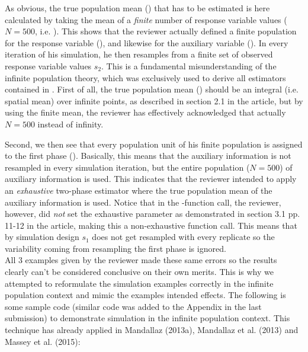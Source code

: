 \documentclass{article}
\begin{document}
As obvious, the true population mean () that has to be estimated is here calculated by taking the mean of a \textit{finite} number of response variable values ($N=500$, i.e. ). This shows that the reviewer actually defined a finite population for the response variable (), and likewise for the auxiliary variable (). In every iteration of his simulation, he then resamples from a finite set of observed response variable values $s_2$. This is a fundamental misunderstanding of the infinite population theory, which was exclusively used to derive all estimators contained in . First of all, the true population mean () should be an integral (i.e. spatial mean) over infinite points, as described in section 2.1 in the article, but by using the finite mean, the reviewer has effectively acknowledged that actually $N=500$ instead of infinity.\par
Second, we then see that every population unit of his finite population is assigned to the first phase (). Basically, this means that the auxiliary information is not resampled in every simulation iteration, but the entire population ($N=500$) of auxiliary information  is used. This indicates that the reviewer intended to apply an \textit{exhaustive} two-phase estimator where the true population mean of the auxiliary information is used. Notice that in the -function call, the reviewer, however, did \textit{not} set the exhaustive parameter as demonstrated in section 3.1 pp. 11-12 in the article, making this a non-exhaustive function call. This means that by simulation design $s_1$ does not get resampled with every replicate so the variability coming from resampling the first phase is ignored.\\

All 3 examples given by the reviewer made these same errors so the results clearly can't be considered conclusive on their own merits.  This is why we attempted to reformulate the simulation examples correctly in the infinite population context and mimic the examples intended effects. The following is some sample code (similar code was added to the Appendix in the last submission) to demonstrate simulation in the infinite population context.  This technique has already applied in Mandallaz (2013a), Mandallaz et al. (2013) and Massey et al. (2015):
\end{document}
